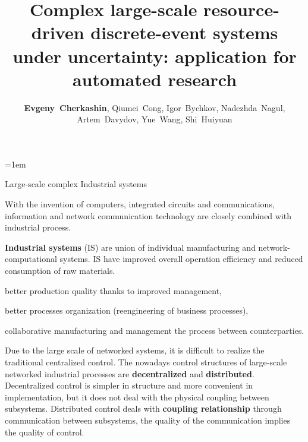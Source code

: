 \documentclass[10pt,dvipsnames]{beamer}
\def\remph#1{\textcolor{Mahogany}{\bfseries #1}}
\begin{document}
\parindent=1em
\title[Complex large-scale DES under uncertainties: application for automated research]{Complex large-scale resource-driven discrete-event systems under uncertainty: application for automated research}
\author{
\def\and{, }
\remph{Evgeny~Cherkashin}\and
Qiumei~Cong\and
Igor~Bychkov\and
Nadezhda~Nagul\and
Artem~Davydov\and
Yue~Wang\and
Shi~Huiyuan}


\maketitle

\begin{frame}{Large-scale complex Industrial systems}

  With the invention of computers, integrated circuits and communications, information and network communication technology are closely combined with industrial process.

  \remph{Industrial systems} (IS) are union of individual manufacturing and network-computational systems. IS have improved overall operation efficiency and reduced consumption of raw materials.
  \begin{description} \color{MidnightBlue}
  \item[1980-th] better production quality thanks to improved management,
  \item[1990-th] better processes organization (reengineering of business processes),
  \item[2000-th] collaborative manufacturing and management the process between counterparties.
  \end{description}

  Due to the large scale of networked systems, it is difficult to realize the traditional centralized control. The nowadays control structures of large-scale networked industrial processes are \remph{decentralized} and \remph{distributed}.  Decentralized control is simpler in structure and more convenient in implementation, but it does not deal with the physical coupling between subsystems.  Distributed control deals with \remph{coupling relationship} through communication between subsystems, the quality of the communication implies the quality of control.

\end{frame}
\end{document}

